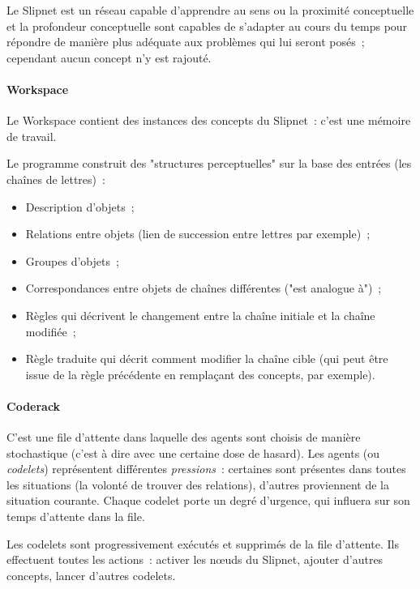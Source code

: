 \documentclass[a4paper, 12pt]{article}
\begin{document}
Le Slipnet est un réseau capable d'apprendre au sens ou la proximité conceptuelle et la profondeur conceptuelle sont capables de s'adapter au cours du temps pour répondre de manière plus adéquate aux problèmes qui lui seront posés~; cependant aucun concept n'y est rajouté.

\paragraph{Workspace}
Le Workspace contient des instances des concepts du Slipnet~: c'est une mémoire de travail.%

Le programme construit des "structures perceptuelles" sur la base des entrées (les chaînes de lettres)~: 
\begin{itemize}
 \item Description d'objets~;
 \item Relations entre objets (lien de succession entre lettres par exemple)~;
 \item Groupes d'objets~;
 \item Correspondances entre objets de chaînes différentes ("est analogue à")~;
 \item Règles qui décrivent le changement entre la chaîne initiale et la chaîne modifiée~;
 \item Règle traduite qui décrit comment modifier la chaîne cible (qui peut être issue de la règle précédente en remplaçant des concepts, par exemple).
\end{itemize}


\paragraph{Coderack}
C'est une file d'attente dans laquelle des agents sont choisis de manière stochastique (c'est à dire avec une certaine dose de hasard). Les agents (ou \textit{codelets}) représentent différentes \textit{pressions}~: certaines sont présentes dans toutes les situations (la volonté de trouver des relations), d'autres proviennent de la situation courante. Chaque codelet porte un degré d'urgence, qui influera sur son temps d'attente dans la file.

Les codelets sont progressivement exécutés et supprimés de la file d'attente. Ils effectuent toutes les actions~: activer les n\oe{}uds du Slipnet, ajouter d'autres concepts, lancer d'autres codelets.
\end{document}
